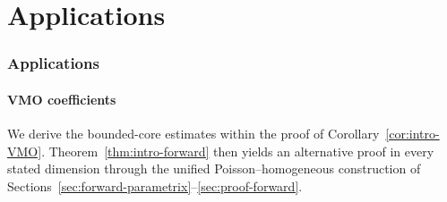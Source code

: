 \documentclass[12pt]{amsart}
\theoremstyle{remark}
\newtheorem{remark}[theorem]{Remark}
\begin{document}











\part{Applications}\label{part3}

\section{Applications}
\label{sec:applications}

\subsection{VMO coefficients}

We derive the bounded-core estimates within the proof of
Corollary~\ref{cor:intro-VMO}.  Theorem~\ref{thm:intro-forward} then yields
an alternative proof in every stated dimension through the unified
Poisson--homogeneous construction of Sections~\ref{sec:forward-parametrix}--\ref{sec:proof-forward}.
\end{document}
